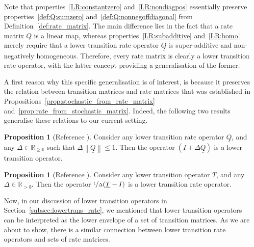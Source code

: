 \documentclass[10pt,a4paper]{paper}
\theoremstyle{definition}
\newtheorem{proposition}[theorem]{Proposition}
\newcommand{\reals}{\mathbb{R}}
\newcommand{\realspos}{\reals_{>0}}
\newcommand{\realsnonneg}{\reals_{\geq 0}}
\newcommand{\lt}{\underline{T}}
\newcommand{\lrate}{\underline{Q}}
\newcommand{\norm}[1]{\left\lVert #1 \right\rVert}
\begin{document}
Note that properties~\ref{LR:constantzero} and~\ref{LR:nondiagpos} essentially preserve properties~\ref{def:Q:sumzero} and~\ref{def:Q:nonnegoffdiagonal} from Definition~\ref{def:rate_matrix}. The main difference lies in the fact that a rate matrix $Q$ is a linear map, whereas properties~\ref{LR:subadditive} and~\ref{LR:homo} merely require that a lower transition rate operator $\lrate$ is super-additive and non-negatively homogeneous. Therefore, every rate matrix is clearly a lower transition rate operator, with the latter concept providing a generalisation of the former.

A first reason why this specific generalisation is of interest, is because it preserves the relation between transition matrices and rate matrices that was established in Propositions~\ref{prop:stochastic_from_rate_matrix} and~\ref{prop:rate_from_stochastic_matrix}. Indeed, the following two results generalise these relations to our current setting.


\begin{proposition}[Reference {\cite[Proposition 5]{DeBock:2016}}]\label{lemma:normQsmallenough}
Consider any lower transition rate operator $\lrate$, and any $\Delta\in\realsnonneg$ such that $\Delta\norm{\lrate}\leq 1$. Then the operator $(I+\Delta\lrate)$ is a lower transition operator.
\end{proposition}

\begin{proposition}[Reference {\cite[Proposition 6]{DeBock:2016}}]\label{lemma:lower_trans_to_lower_rate}
Consider any lower transition operator $\lt$, and any $\Delta\in\realspos$. Then the operator $\nicefrac{1}{\Delta}(\lt - I)$ is a lower transition rate operator.
\end{proposition}

Now, in our discussion of lower transition operators in Section~\ref{subsec:lowertrans_rate}, we mentioned that lower transition operators can be interpreted as the lower envelope of a set of transition matrices. As we are about to show, there is a similar connection between lower transition rate operators and sets of rate matrices.
\end{document}
